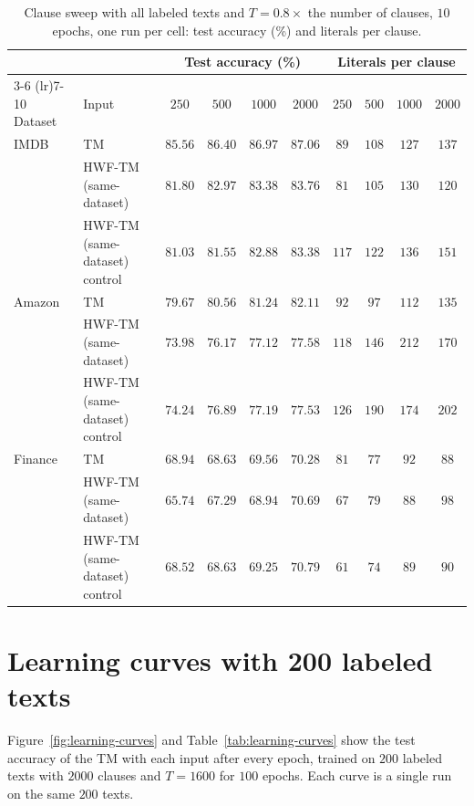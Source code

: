 \begin{table}[H]
\centering
\small
\setlength{\tabcolsep}{4pt}
\caption{Clause sweep with all labeled texts and $T = 0.8 \times$ the number of clauses, $10$
epochs, one run per cell: test accuracy (\%) and literals per clause.}
\label{tab:app-full-sweep}
\begin{tabular}{llcccccccc}
\toprule
 & & \multicolumn{4}{c}{Test accuracy (\%)} & \multicolumn{4}{c}{Literals per clause} \\
\cmidrule(lr){3-6} \cmidrule(lr){7-10}
Dataset & Input & $250$ & $500$ & $1000$ & $2000$ & $250$ & $500$ & $1000$ & $2000$ \\
\midrule
IMDB & TM & $85.56$ & $86.40$ & $86.97$ & $87.06$ & $89$ & $108$ & $127$ & $137$ \\
 & HWF-TM (same-dataset) & $81.80$ & $82.97$ & $83.38$ & $83.76$ & $81$ & $105$ & $130$ & $120$ \\
 & HWF-TM (same-dataset) control & $81.03$ & $81.55$ & $82.88$ & $83.38$ & $117$ & $122$ & $136$ & $151$ \\
\midrule
Amazon & TM & $79.67$ & $80.56$ & $81.24$ & $82.11$ & $92$ & $97$ & $112$ & $135$ \\
 & HWF-TM (same-dataset) & $73.98$ & $76.17$ & $77.12$ & $77.58$ & $118$ & $146$ & $212$ & $170$ \\
 & HWF-TM (same-dataset) control & $74.24$ & $76.89$ & $77.19$ & $77.53$ & $126$ & $190$ & $174$ & $202$ \\
\midrule
Finance & TM & $68.94$ & $68.63$ & $69.56$ & $70.28$ & $81$ & $77$ & $92$ & $88$ \\
 & HWF-TM (same-dataset) & $65.74$ & $67.29$ & $68.94$ & $70.69$ & $67$ & $79$ & $88$ & $98$ \\
 & HWF-TM (same-dataset) control & $68.52$ & $68.63$ & $69.25$ & $70.79$ & $61$ & $74$ & $89$ & $90$ \\
\bottomrule
\end{tabular}
\end{table}

\section{Learning curves with 200 labeled texts}
\label{app:learning-curves}

Figure~\ref{fig:learning-curves} and Table~\ref{tab:learning-curves} show the test accuracy of
the TM with each input after every epoch, trained on $200$ labeled texts with $2000$ clauses and
$T = 1600$ for $100$ epochs. Each curve is a single run on the same $200$ texts.

